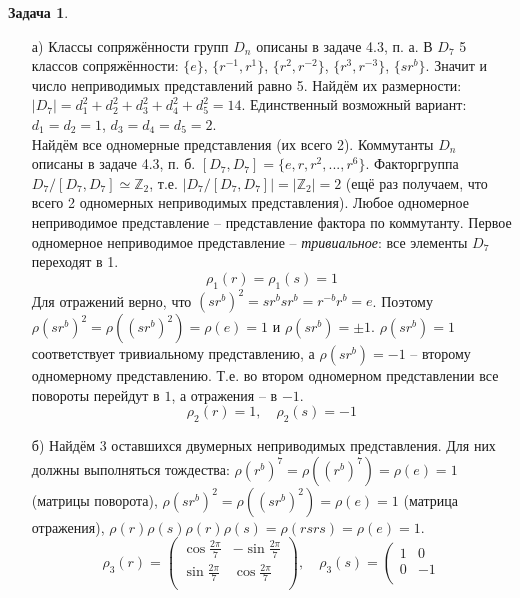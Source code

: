 \documentclass[12pt]{article}
\theoremstyle{definition}
\newtheorem{zad}{Задача}[section]
\begin{document}
\begin{zad}
\begin{itemize}
\item[а)] 
Классы сопряжённости групп $D_n$ описаны в задаче 4.3, п. а. В $D_7$ 5 классов сопряжённости: $\{e\}$, $\{r^{-1},r^1\}$, $\{r^2,r^{-2}\}$, $\{r^3,r^{-3}\}$, $\{sr^b\}$. Значит и число неприводимых представлений равно 5. Найдём их размерности: $|D_7|=d_1^2+d_2^2+d_3^2+d_4^2+d_5^2=14$. Единственный возможный вариант: $d_1=d_2=1$, $d_3=d_4=d_5=2$.\\
Найдём все одномерные представления (их всего 2). Коммутанты $D_n$ описаны в задаче 4.3, п. б. $[D_7,D_7]=\{e,r,r^2,...,r^{6}\}$. Факторгруппа $D_7/[D_7,D_7]\simeq\mathbb{Z}_2$, т.е. $|D_7/[D_7,D_7]|=|\mathbb{Z}_2|=2$ (ещё раз получаем, что всего 2 одномерных неприводимых представления). Любое одномерное неприводимое представление -- представление фактора по коммутанту. Первое одномерное неприводимое представление -- \textit{тривиальное}: все элементы $D_7$ переходят в 1.
\begin{equation}
    \boxed{\rho_1(r)=\rho_1(s)=1}
\end{equation}
Для отражений верно, что $(sr^b)^2=sr^bsr^b=r^{-b}r^b=e$. Поэтому $\rho(sr^b)^2=\rho((sr^b)^2)=\rho(e)=1$ и $\rho(sr^b)=\pm 1$. $\rho(sr^b)=1$ соответствует тривиальному представлению, а $\rho(sr^b)=-1$ -- второму одномерному представлению. Т.е. во втором одномерном представлении все повороты перейдут в $1$, а отражения -- в $-1$.
\begin{equation}
    \boxed{\rho_2(r)=1,\quad \rho_2(s)=-1}
\end{equation}
\item[б)] Найдём 3 оставшихся двумерных неприводимых представления. Для них должны выполняться тождества: $\rho(r^b)^7=\rho((r^b)^7)=\rho(e)=1$ (матрицы поворота), $\rho(sr^b)^2=\rho((sr^b)^2)=\rho(e)=1$ (матрица отражения), $\rho(r)\rho(s)\rho(r)\rho(s)=\rho(rsrs)=\rho(e)=1$.
\begin{equation}
    \boxed{\rho_3(r)=\left(
    \begin{array}{cc}
    \cos\frac{2\pi}{7} & -\sin\frac{2\pi}{7}\\
    \sin\frac{2\pi}{7} & \cos\frac{2\pi}{7}\\
    \end{array}
    \right),\quad \rho_3(s)=\left(
    \begin{array}{cc}
    1 & 0\\
    0 & -1\\
    \end{array}
}
\end{equation}
\end{itemize}
\end{zad}
\end{document}
